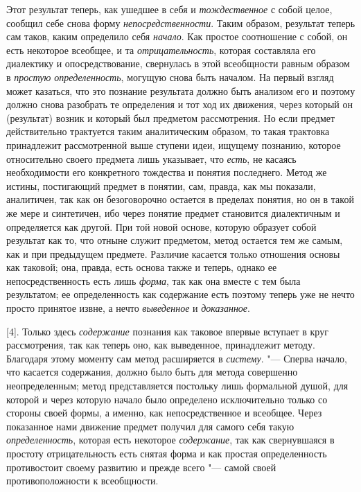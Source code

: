 Этот результат теперь, как ушедшее в себя и {\em тождественное} с
собой целое, сообщил себе снова форму {\em непосредственности}.
Таким образом, результат теперь сам таков, каким определило
себя {\em начало}. Как
простое соотношение с собой, он есть некоторое всеобщее, и та
{\em отрицательность},
которая составляла его диалектику и опосредствование,
свернулась в этой всеобщности равным образом в
{\em простую определенность},
могущую снова быть началом. На первый взгляд может казаться,
что это познание результата должно быть анализом его и поэтому должно снова
разобрать те определения и тот ход их движения, через который он
(результат) возник и который был предметом рассмотрения. Но если предмет
действительно трактуется таким аналитическим образом, то такая трактовка
принадлежит рассмотренной выше ступени идеи, ищущему познанию, которое
относительно своего предмета лишь указывает, что {\em есть}, не касаясь
необходимости его конкретного тождества и понятия последнего. Метод же
истины, постигающий предмет в понятии, сам, правда, как мы показали,
аналитичен, так как он безоговорочно остается в пределах понятия, но он в
такой же мере и синтетичен, ибо через понятие предмет становится
диалектичным и определяется как другой. При той новой основе, которую
образует собой результат как то, что отныне служит предметом, метод
остается тем же самым, как и при предыдущем предмете. Различие касается
только отношения основы как таковой; она, правда, есть основа также и
теперь, однако ее непосредственность есть лишь {\em форма}, так как она
вместе с тем была результатом; ее определенность как содержание есть
поэтому теперь уже не нечто просто принятое извне, а нечто
{\em выведенное} и {\em доказанное}.

[4]. Только здесь {\em содержание} познания
как таковое впервые вступает в круг рассмотрения, так как теперь оно, как
выведенное, принадлежит методу. Благодаря этому моменту сам метод
расширяется в {\em систему}. "---
Сперва начало, что касается содержания, должно было быть для
метода совершенно неопределенным; метод представляется постольку лишь
формальной душой, для которой и через которую начало было определено
исключительно только со стороны своей формы, а именно, как непосредственное
и всеобщее. Через показанное нами движение предмет получил для самого себя
такую {\em определенность}, которая есть некоторое {\em содержание}, так как
свернувшаяся в простоту отрицательность есть снятая форма и как простая
определенность противостоит своему развитию и прежде всего
"--- самой своей противоположности к всеобщности.

